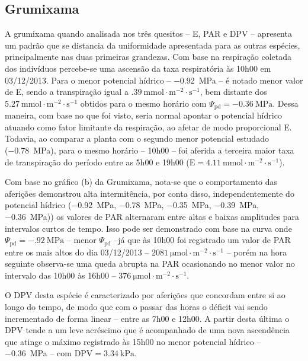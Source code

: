 \documentclass[a4paper, 12pt]{article}
\begin{document}
	\subsection{Grumixama}
	
	A grumixama quando analisada nos três quesitos -- E, PAR e DPV -- apresenta um padrão que se distancia da uniformidade apresentada para as outras espécies, principalmente nas duas primeiras grandezas. Com base na respiração coletada dos indivíduos percebe-se uma ascensão da taxa respiratória às 10h00 em 03/12/2013. Para o menor potencial hídrico -- \SI{-.92}{\mega\pascal} -- é notado menor valor de E, sendo a transpiração igual a $\SI{.39}{\milli\mole\cdot\meter^{-2}\cdot\second^{-1}}$, bem distante dos $\SI{5.27}{\milli\mole\cdot\meter^{-2}\cdot\second^{-1}}$ obtidos para o mesmo horário com $\Psi_{\textrm{pd}}=\SI{-0.36}{\mega\pascal}$. Dessa maneira, com base no que foi visto, seria normal apontar o potencial hídrico atuando como fator limitante da respiração, ao afetar de modo proporcional E. Todavia, ao comparar a planta com o segundo menor potencial estudado (\SI{-.78}{\mega\pascal}), para o mesmo horário -- 10h00 -- foi aferida a terceira maior taxa de transpiração do período entre as 5h00 e 19h00 ($\textrm{E}=\SI{4.11}{\milli\mole\cdot\meter^{-2}\cdot\second^{-1}}$).
	
	Com base no gráfico (b) da Grumixama, nota-se que o comportamento das aferições demonstrou alta intermitência, por conta disso, independentemente do potencial hídrico (\SI{-.92}{\mega\pascal}, \SI{-.78}{\mega\pascal}, \SI{-.35}{\mega\pascal}, \SI{-.39}{\mega\pascal}, \SI{-.36}{\mega\pascal})) os valores de PAR alternaram entre altas e baixas amplitudes para intervalos curtos de tempo. Isso pode ser demonstrado com base na curva onde $\Psi_{\textrm{pd}}=\SI{-.92}{\mega\pascal}$ -- menor $\Psi_{\textrm{pd}}$ --já que às 10h00 foi registrado um valor de PAR entre os mais altos do dia 03/12/2013 -- $\SI{2081}{\micro\mole\cdot\meter^{-2}\cdot\second^{-1}}$ -- porém na hora seguinte observa-se uma queda abrupta na PAR ocasionando no menor valor no intervalo das 10h00 às 16h00 -- $\SI{376}{\micro\mole\cdot\meter^{-2}\cdot\second^{-1}}$. 
	
	O DPV desta espécie é caracterizado por aferições que concordam entre si ao longo do tempo, de modo que com o passar das horas o déficit vai sendo incrementado de forma linear -- entre as 7h00 e 12h00. A partir desta última o DPV tende a um leve acréscimo que é acompanhado de uma nova ascendência que atinge o máximo registrado às 15h00 no menor potencial hídrico -- \SI{-.36}{\mega\pascal} -- com $\textrm{DPV}=\SI{3.34}{\kilo\pascal}$.
	
\end{document}
